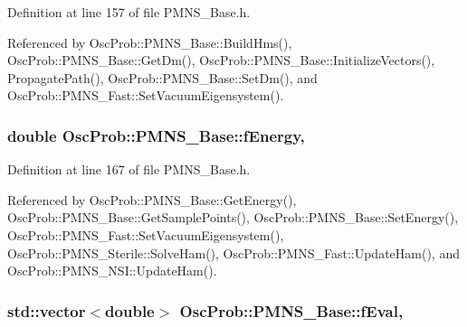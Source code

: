 Definition at line 157 of file P\+M\+N\+S\+\_\+\+Base.\+h.



Referenced by Osc\+Prob\+::\+P\+M\+N\+S\+\_\+\+Base\+::\+Build\+Hms(), Osc\+Prob\+::\+P\+M\+N\+S\+\_\+\+Base\+::\+Get\+Dm(), Osc\+Prob\+::\+P\+M\+N\+S\+\_\+\+Base\+::\+Initialize\+Vectors(), Propagate\+Path(), Osc\+Prob\+::\+P\+M\+N\+S\+\_\+\+Base\+::\+Set\+Dm(), and Osc\+Prob\+::\+P\+M\+N\+S\+\_\+\+Fast\+::\+Set\+Vacuum\+Eigensystem().

\subsubsection[{\texorpdfstring{f\+Energy}{fEnergy}}]{\setlength{\rightskip}{0pt plus 5cm}double Osc\+Prob\+::\+P\+M\+N\+S\+\_\+\+Base\+::f\+Energy\hspace{0.3cm}{\ttfamily [protected]}, {\ttfamily [inherited]}}\hypertarget{classOscProb_1_1PMNS__Base_a2800af6d436972f3e900867790c046b0}{}\label{classOscProb_1_1PMNS__Base_a2800af6d436972f3e900867790c046b0}


Definition at line 167 of file P\+M\+N\+S\+\_\+\+Base.\+h.



Referenced by Osc\+Prob\+::\+P\+M\+N\+S\+\_\+\+Base\+::\+Get\+Energy(), Osc\+Prob\+::\+P\+M\+N\+S\+\_\+\+Base\+::\+Get\+Sample\+Points(), Osc\+Prob\+::\+P\+M\+N\+S\+\_\+\+Base\+::\+Set\+Energy(), Osc\+Prob\+::\+P\+M\+N\+S\+\_\+\+Fast\+::\+Set\+Vacuum\+Eigensystem(), Osc\+Prob\+::\+P\+M\+N\+S\+\_\+\+Sterile\+::\+Solve\+Ham(), Osc\+Prob\+::\+P\+M\+N\+S\+\_\+\+Fast\+::\+Update\+Ham(), and Osc\+Prob\+::\+P\+M\+N\+S\+\_\+\+N\+S\+I\+::\+Update\+Ham().

\subsubsection[{\texorpdfstring{f\+Eval}{fEval}}]{\setlength{\rightskip}{0pt plus 5cm}std\+::vector$<$double$>$ Osc\+Prob\+::\+P\+M\+N\+S\+\_\+\+Base\+::f\+Eval\hspace{0.3cm}{\ttfamily [protected]}, {\ttfamily [inherited]}}\hypertarget{classOscProb_1_1PMNS__Base_a6319c34d7decbb9d7d6da279c06e8c2d}{}\label{classOscProb_1_1PMNS__Base_a6319c34d7decbb9d7d6da279c06e8c2d}


